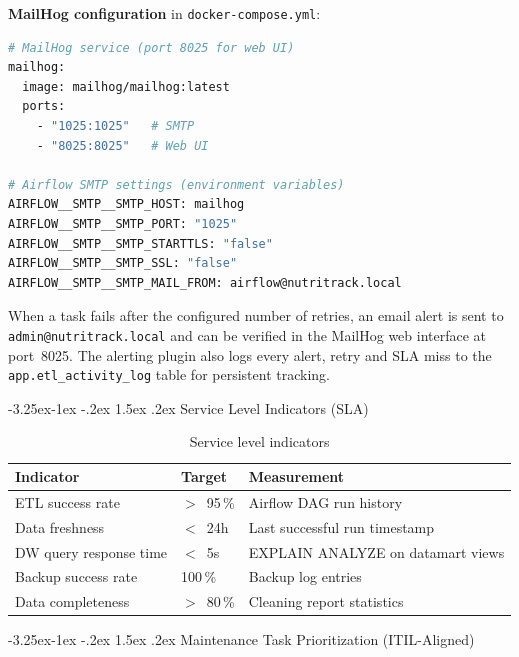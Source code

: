 \documentclass[a4paper,11pt,oneside,openany]{report}
\makeatletter
\renewcommand\subsection{\@startsection{subsection}{2}{\z@}%
  {-3.25ex\@plus -1ex \@minus -.2ex}%
  {1.5ex \@plus .2ex}%
  {\normalfont\large\bfseries\color{ntdarkgreen}}}
\makeatother
\begin{document}
\textbf{MailHog configuration} in \texttt{docker-compose.yml}:

\begin{lstlisting}[language=bash, caption={MailHog service and Airflow SMTP configuration}]
# MailHog service (port 8025 for web UI)
mailhog:
  image: mailhog/mailhog:latest
  ports:
    - "1025:1025"   # SMTP
    - "8025:8025"   # Web UI

# Airflow SMTP settings (environment variables)
AIRFLOW__SMTP__SMTP_HOST: mailhog
AIRFLOW__SMTP__SMTP_PORT: "1025"
AIRFLOW__SMTP__SMTP_STARTTLS: "false"
AIRFLOW__SMTP__SMTP_SSL: "false"
AIRFLOW__SMTP__SMTP_MAIL_FROM: airflow@nutritrack.local
\end{lstlisting}

When a task fails after the configured number of retries, an email alert
is sent to \texttt{admin@nutritrack.local} and can be verified in the
MailHog web interface at port~8025. The alerting plugin also logs every
alert, retry and SLA miss to the \texttt{app.etl\_activity\_log} table
for persistent tracking.

\subsection{Service Level Indicators (SLA)}

\begin{table}[H]
\centering
\caption{Service level indicators}
\label{tab:sla}
\begin{tabularx}{\textwidth}{L{4cm} C{2cm} L{6.5cm}}
\toprule
\textbf{Indicator} & \textbf{Target} & \textbf{Measurement} \\
\midrule
ETL success rate & $>$~95\,\% & Airflow DAG run history \\
Data freshness & $<$~24h & Last successful run timestamp \\
DW query response time & $<$~5s & EXPLAIN ANALYZE on datamart views \\
Backup success rate & 100\,\% & Backup log entries \\
Data completeness & $>$~80\,\% & Cleaning report statistics \\
\bottomrule
\end{tabularx}
\end{table}

\subsection{Maintenance Task Prioritization (ITIL-Aligned)}
\end{document}
